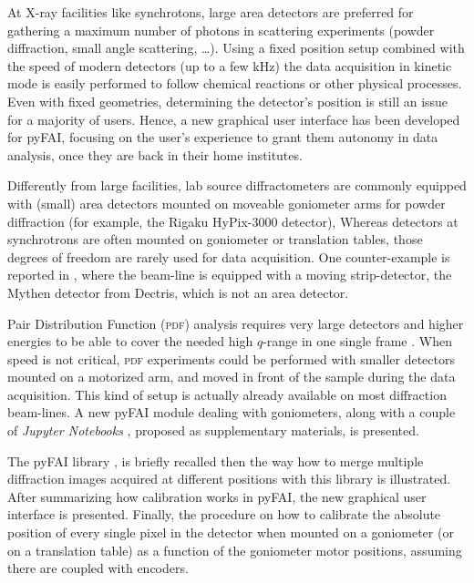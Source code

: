 \documentclass[preprint]{iucr}              %
\begin{document}
At X-ray facilities like synchrotons, large area detectors are 
preferred for gathering a maximum number of photons in
scattering experiments (powder diffraction, small angle
scattering, \ldots).
Using a fixed position setup combined with the speed of modern detectors (up
to a few kHz) the data acquisition in kinetic mode is easily performed to 
follow chemical reactions or other physical processes.
Even with fixed geometries, determining the detector's position is
still an issue for a majority of users. 
Hence, a new graphical user interface has been developed for pyFAI, focusing
on the user's experience to grant them autonomy in data analysis, once they
are back in their home institutes.

Differently from large facilities, lab source diffractometers
are commonly equipped with (small) area detectors mounted on moveable goniometer
arms for powder diffraction (for example, the Rigaku HyPix-3000 detector),
Whereas detectors at synchrotrons are often mounted on goniometer or
translation tables, those degrees of freedom are rarely used for data
acquisition.
One counter-example is reported in \cite{Gao:kc5032}, where the beam-line
is equipped with a moving strip-detector, the Mythen detector from Dectris,
which is not an area detector.




Pair Distribution Function (\textsc{pdf}) analysis requires very large
detectors and higher energies to be able to cover the needed high $q$-range in
one single frame \cite{Chupas:wf5000}.
When speed is not critical, \textsc{pdf} experiments could be performed
with smaller detectors mounted on a motorized arm, and moved in front of
the sample during the data acquisition. 
This kind of setup is actually already available on most diffraction
beam-lines. 
A new pyFAI module dealing with goniometers, along with
a couple of \textit{Jupyter Notebooks}
\cite{ipython}, proposed as supplementary materials, is presented.

The pyFAI library \cite{fv5028}, is briefly recalled then the way how to
merge multiple diffraction images acquired at different positions with this
library \cite{PyFAI_PDJ} is illustrated. 
After summarizing how calibration works in pyFAI, the new graphical user
interface is presented.
Finally, the procedure on how to calibrate the absolute position of
every single pixel in the detector when mounted on a goniometer (or on a
translation table) as a function of the goniometer motor positions, assuming
there are coupled with encoders. 
\end{document}
